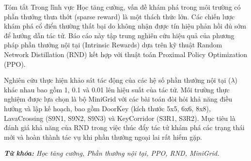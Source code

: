 \documentclass{uetgraduation}
\begin{document}
\begin{preamble}{Tóm tắt}
Trong lĩnh vực Học tăng cường, vấn đề khám phá trong môi trường có phần thưởng thưa thớt (sparse reward) là một thách thức lớn. Các chiến lược khám phá cổ điển thường thất bại do không nhận được tín hiệu phản hồi đủ sớm để hướng dẫn tác tử. Báo cáo này tập trung nghiên cứu hiệu quả của phương pháp phần thưởng nội tại (Intrinsic Rewards) dựa trên kỹ thuật Random Network Distillation (RND) kết hợp với thuật toán Proximal Policy Optimization (PPO).

Nghiên cứu thực hiện khảo sát tác động của các hệ số phần thưởng nội tại ($\lambda$) khác nhau bao gồm 1, 0.1 và 0.01 lên hiệu suất của tác tử. Môi trường thực nghiệm được lựa chọn là bộ MiniGrid với các bài toán đòi hỏi khả năng điều hướng và lập kế hoạch, bao gồm DoorKey (kích thước 5x5, 6x6, 8x8), LavaCrossing (S9N1, S9N2, S9N3) và KeyCorridor (S3R1, S3R2). Mục tiêu là đánh giá khả năng của RND trong việc thúc đẩy tác tử khám phá các trạng thái mới và hoàn thành tác vụ khi phần thưởng ngoại lai rất hiếm gặp.

\textit{\textbf{Từ khóa:} Học tăng cường, Phần thưởng nội tại, PPO, RND, MiniGrid.}
\end{preamble}
\end{document}
